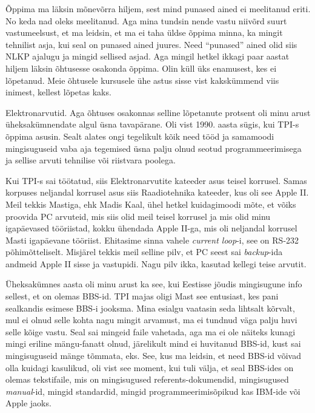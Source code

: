 
Õppima ma läksin mõnevõrra hiljem, sest mind 
punased ained ei  meelitanud eriti. No keda nad oleks meelitanud. Aga mina tundsin 
nende vastu niivõrd suurt vastumeelsust,  et ma leidsin, et ma ei taha  üldse 
õppima minna, ka mingit tehnilist asja, kui seal on  punased ained juures. Need 
\enquote{punased} ained olid siis  NLKP ajalugu ja mingid sellised asjad. Aga 
mingil hetkel ikkagi paar aastat hiljem läksin õhtusesse osakonda õppima. Olin 
küll üks enamusest, kes ei lõpetanud. Meie õhtusele kursusele ühe astus sisse vist 
kakskümmend viis inimest, kellest lõpetas kaks. 


Elektronarvutid. Aga õhtuses osakonnas selline lõpetanute protsent oli minu 
arust üheksakümnendate algul üsna tavapärane. Oli vist 1990. aasta sügis, kui 
TPI-s õppima asusin. Sealt alates ongi tegelikult kõik need tööd ja samamoodi 
mingisuguseid vaba aja tegemised üsna palju olnud seotud programmeerimisega ja 
sellise arvuti tehnilise või riistvara poolega.

Kui  TPI-s sai töötatud, siis Elektronarvutite kateeder asus teisel korrusel. 
Samas korpuses neljandal korrusel asus siis Raadiotehnika 
kateeder, kus oli see Apple II. Meil tekkis 
Mastiga, ehk Madis Kaal, 
ühel hetkel kuidagimoodi mõte, et võiks proovida PC arvuteid, mis siis olid 
meil teisel korrusel ja mis olid minu igapäevased tööriistad, kokku 
ühendada  Apple II-ga, mis oli neljandal korrusel Masti igapäevane tööriist. 
Ehitasime sinna vahele \emph{current loop}-i, see on RS-232 põhimõtteliselt. 
Misjärel tekkis meil  selline 
pilv, et PC seest sai \emph{backup}-ida  andmeid Apple II sisse ja vastupidi. 
Nagu pilv ikka, kasutad kellegi teise arvutit. 

Üheksakümnes aasta oli minu arust ka see, kui Eestisse jõudis mingisugune info 
sellest, et on olemas BBS-id. TPI majas oligi Mast  see 
entusiast, kes pani sealkandis esimese BBS-i jooksma. Mina esialgu vaatasin 
seda lihtsalt kõrvalt, mul ei olnud selle kohta nagu mingit arvamust,  ma ei 
tundnud  väga palju huvi selle kõige vastu. Seal sai mingeid faile vahetada, 
aga  ma ei ole näiteks kunagi mingi eriline mängu-fanatt olnud, järelikult mind 
ei huvitanud BBS-id, kust sai mingisuguseid mänge tõmmata, eks. See, kus ma 
leidsin, et need BBS-id võivad olla kuidagi kasulikud,  oli vist see moment, 
kui tuli välja, et seal BBS-ides on olemas  tekstifaile, mis on mingisugused 
referents-dokumendid, mingisugused \emph{manual}-id, mingid standardid, mingid 
programmeerimisõpikud kas IBM-ide või Apple jaoks.

